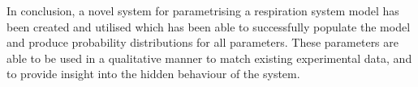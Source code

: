In conclusion, a novel system for parametrising a respiration system model has been created and utilised which has been able to successfully populate the model and produce probability distributions for all parameters. These parameters are able to be used in a qualitative manner to match existing experimental data, and to provide insight into the hidden behaviour of the system.